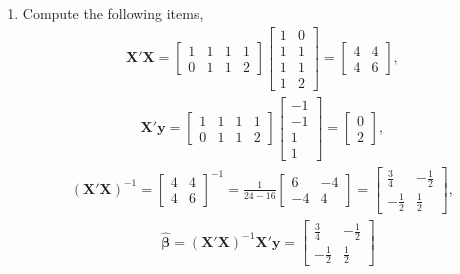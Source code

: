 \documentclass[10pt]{article}
\begin{document}
\begin{enumerate}[1)]
\item
Compute the following items,
\begin{align*}
\pmb{X}'\pmb{X}=
  \begin{bmatrix}
    1 & 1 & 1 & 1\\
    0 & 1 & 1 & 2
  \end{bmatrix}
  \begin{bmatrix}
    1 & 0\\
    1 & 1\\
    1 & 1\\
    1 & 2
  \end{bmatrix}
=
  \begin{bmatrix}
    4 & 4\\
    4 & 6
  \end{bmatrix}
,
\end{align*}
\begin{align*}
\pmb{X}'\pmb{y}=
  \begin{bmatrix}
    1 & 1 & 1 & 1\\
    0 & 1 & 1 & 2
  \end{bmatrix}
  \begin{bmatrix}
    -1\\
    -1\\
    1\\
    1
  \end{bmatrix}
=
  \begin{bmatrix}
    0\\
    2
  \end{bmatrix}
,
\end{align*}
\begin{align*}
(\pmb{X}'\pmb{X})^{-1}=
  \begin{bmatrix}
    4 & 4\\
    4 & 6
  \end{bmatrix}
^{-1}=
\frac{1}{24-16}
  \begin{bmatrix}
    6 & -4\\
    -4 & 4
  \end{bmatrix}
=
  \begin{bmatrix}
    \frac{3}{4} & -\frac{1}{2}\\
    -\frac{1}{2} & \frac{1}{2}
  \end{bmatrix}
,
\end{align*}
\begin{align*}
&\pmb{\hat{\beta}}=(\pmb{X}'\pmb{X})^{-1}\pmb{X}'\pmb{y}=
  \begin{bmatrix}
    \frac{3}{4} & -\frac{1}{2}\\
    -\frac{1}{2} & \frac{1}{2}

\end{bmatrix}
\end{align*}
\end{enumerate}
\end{document}
